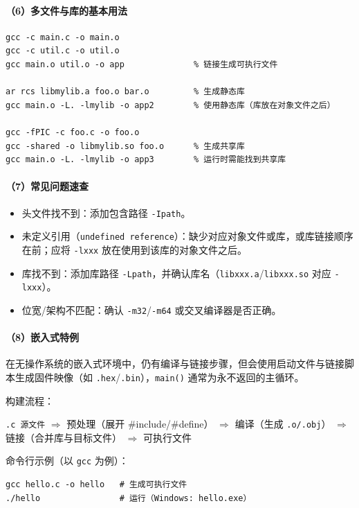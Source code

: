 \paragraph{（6）多文件与库的基本用法}
\begin{verbatim}
gcc -c main.c -o main.o
gcc -c util.c -o util.o
gcc main.o util.o -o app              % 链接生成可执行文件

ar rcs libmylib.a foo.o bar.o         % 生成静态库
gcc main.o -L. -lmylib -o app2        % 使用静态库（库放在对象文件之后）

gcc -fPIC -c foo.c -o foo.o
gcc -shared -o libmylib.so foo.o      % 生成共享库
gcc main.o -L. -lmylib -o app3        % 运行时需能找到共享库
\end{verbatim}

\paragraph{（7）常见问题速查}
\begin{itemize}
  \item 头文件找不到：添加包含路径 \texttt{-Ipath}。
  \item 未定义引用（\texttt{undefined reference}）：缺少对应对象文件或库，或库链接顺序在前；应将 \texttt{-lxxx} 放在使用到该库的对象文件之后。
  \item 库找不到：添加库路径 \texttt{-Lpath}，并确认库名（\texttt{libxxx.a}/\texttt{libxxx.so} 对应 \texttt{-lxxx}）。
  \item 位宽/架构不匹配：确认 \texttt{-m32}/\texttt{-m64} 或交叉编译器是否正确。
\end{itemize}

\paragraph{（8）嵌入式特例}
在无操作系统的嵌入式环境中，仍有编译与链接步骤，但会使用启动文件与链接脚本生成固件映像（如 \texttt{.hex}/\texttt{.bin}），\texttt{main()} 通常为永不返回的主循环。

构建流程：
\begin{center}
\texttt{.c 源文件}
$\Rightarrow$ 预处理（展开 \#include/\#define）
$\Rightarrow$ 编译（生成 \texttt{.o/.obj}）
$\Rightarrow$ 链接（合并库与目标文件）
$\Rightarrow$ 可执行文件
\end{center}

命令行示例（以 \texttt{gcc} 为例）：
\begin{verbatim}
gcc hello.c -o hello   # 生成可执行文件
./hello                # 运行（Windows: hello.exe）
\end{verbatim}
